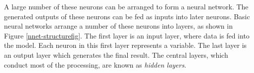 






A large number of these neurons can be arranged to form a neural network. The generated outputs of these neurons can be fed as inputs into later neurons. Basic neural networks arrange a number of these neurons into layers, as shown in Figure \ref{nnet-structurefig}. The first layer is an input layer, where data is fed into the model. Each neuron in this first layer represents a variable. The last layer is an output layer which generates the final result. The central layers, which conduct most of the processing, are known as \textit{hidden layers}.

